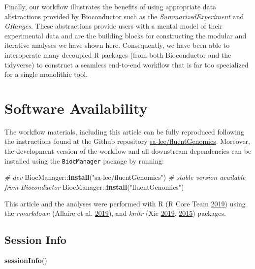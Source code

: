\documentclass[
]{article}
\newenvironment{Shaded}{}{}
\newcommand{\CommentTok}[1]{\textcolor[rgb]{0.38,0.63,0.69}{\textit{#1}}}
\newcommand{\KeywordTok}[1]{\textcolor[rgb]{0.00,0.44,0.13}{\textbf{#1}}}
\newcommand{\NormalTok}[1]{#1}
\newcommand{\OperatorTok}[1]{\textcolor[rgb]{0.40,0.40,0.40}{#1}}
\newcommand{\StringTok}[1]{\textcolor[rgb]{0.25,0.44,0.63}{#1}}
\begin{document}
Finally, our workflow illustrates the benefits of using appropriate data
abstractions provided by Bioconductor such as the \emph{SummarizedExperiment} and
\emph{GRanges}. These abstractions provide users with a mental model of their
experimental data and are the building blocks for constructing the modular and
iterative analyses we have shown here. Consequently, we have been able to
interoperate many decoupled R packages (from both Bioconductor and the
tidyverse) to construct a seamless end-to-end workflow that is far too
specialized for a single monolithic tool.

\hypertarget{software-availability}{%
\section{Software Availability}\label{software-availability}}

The workflow materials, including this article can be fully reproduced
following the instructions found at the Github repository
\href{https://github.com/sa-lee/fluentGenomics}{sa-lee/fluentGenomics}. Moreover,
the development version of the workflow and all downstream dependencies can be
installed using the \texttt{BiocManager} package by running:

\begin{Shaded}
\begin{Highlighting}[]
\CommentTok{# dev}
\NormalTok{BiocManager}\OperatorTok{::}\KeywordTok{install}\NormalTok{(}\StringTok{"sa-lee/fluentGenomics"}\NormalTok{)}
\CommentTok{# stable version available from Bioconductor}
\NormalTok{BiocManager}\OperatorTok{::}\KeywordTok{install}\NormalTok{(}\StringTok{"fluentGenomics"}\NormalTok{)}
\end{Highlighting}
\end{Shaded}

This article and the analyses were performed with R (R Core Team \protect\hyperlink{ref-baser}{2019}) using the
\emph{rmarkdown} (Allaire et al. \protect\hyperlink{ref-rmarkdown}{2019}), and \emph{knitr} (Xie \protect\hyperlink{ref-knitr}{2019}, \protect\hyperlink{ref-xie2015}{2015}) packages.

\hypertarget{session-info}{%
\subsection{Session Info}\label{session-info}}

\begin{Shaded}
\begin{Highlighting}[]
\KeywordTok{sessionInfo}\NormalTok{()}
\end{Highlighting}
\end{Shaded}
\end{document}
